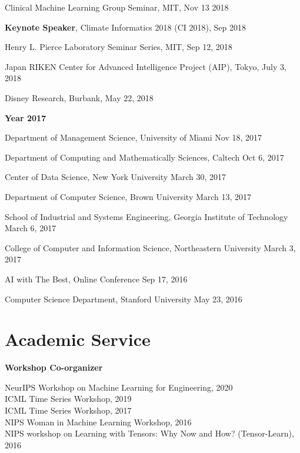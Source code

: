 \documentclass[margin,line]{res}
\begin{document}
\begin{resume}
Clinical Machine Learning Group Seminar, MIT, \hfill {Nov 13  2018} 


\textbf{Keynote Speaker},  Climate Informatics 2018 (CI 2018), \hfill {Sep 2018} 


Henry L. Pierce Laboratory Seminar Series, MIT, \hfill {Sep 12, 2018}

Japan RIKEN  Center for Advanced Intelligence Project (AIP), Tokyo, \hfill {July 3, 2018}

Disney Research, Burbank, \hfill {May 22, 2018}

 {\bf Year  2017}
 
Department of Management Science,  University of Miami  \hfill {Nov 18, 2017}


Department of Computing and Mathematically Sciences,  Caltech  \hfill {Oct 6, 2017}


Center of Data Science, New York University  \hfill {March 30, 2017}


Department of Computer Science, Brown University   \hfill {March 13, 2017}



School of Industrial and Systems Engineering, Georgia Institute of Technology  \hfill {March 6, 2017}


College of Computer and Information Science, Northeastern University  \hfill {March 3, 2017}


 
 AI with The Best, Online Conference \hfill {Sep 17, 2016}
 
 
Computer Science Department,  Stanford University  \hfill {May 23, 2016}
 
 


\section{\sc Academic Service}
{\bf Workshop Co-organizer}

NeurIPS  Workshop on Machine Learning for Engineering, 2020\\
ICML Time Series  Workshop, 2019 \\
ICML Time Series  Workshop, 2017 \\
NIPS Woman in Machine Learning Workshop, 2016 \\
NIPS workshop on Learning with Tensors: Why Now and How? (Tensor-Learn), 2016 \\




\end{resume}
\end{document}
